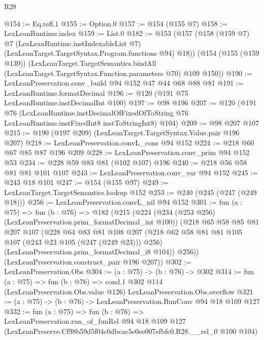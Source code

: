 \begin{lexlean}{R28}
\begin{coremodule}
@154 := Eq.refl.{1}
@155 := Option.{0}
@157 := @154 (@155 @7)
@158 := LexLeanRuntime.index
@159 := List.{0}
@182 := @153
    (@157
      (@158
        (@159 @7)
        @7
        (LexLeanRuntime.instIndexableList @7)
        (LexLeanTarget.TargetSyntax.Program.functions @94)
        @18))
    (@154
      (@155 (@159 @139))
      (LexLeanTarget.TargetSemantics.bindAll
        (LexLeanTarget.TargetSyntax.Function.parameters @70)
        @109
        @150))
@190 := LexLeanPreservation.conv_build @94 @152 @47 @44 @68 @88 @81
@191 := LexLeanRuntime.formatDecimal
@196 := @120 (@191 @75 LexLeanRuntime.instDecimalInt @100)
@197 := @98 @196
@207 := @120
    (@191
      @76
      (LexLeanRuntime.instDecimalOfFixedOfToString
        @76
        LexLeanRuntime.instFixedInt8
        instToStringInt8)
      @104)
@209 := @98 @207 @107
@215 := @190 (@197 @209) (LexLeanTarget.TargetSyntax.Value.pair @196 @207)
@218 := LexLeanPreservation.convL_cons @94 @152
@224 := @218 @60 @67 @85 @87 @196 @209
@228 := LexLeanPreservation.conv_prim @94 @152 @53
@234 := @228 @59 @83 @81 (@102 @107) @196
@240 := @218 @56 @58 @81 @81 @101 @107
@243 := LexLeanPreservation.conv_var @94 @152
@245 := @243 @18 @101
@247 := @154 (@155 @97)
@249 := LexLeanTarget.TargetSemantics.lookup @152
@253 := @240 (@245 (@247 (@249 @18)))
@256 := LexLeanPreservation.convL_nil @94 @152
@301 := fun (a : @75) =>
  fun (b : @76) =>
  @182
    (@215
      (@224
        (@234 (@253 @256) (LexLeanPreservation.prim_formatDecimal_int @100))
        (@218
          @65
          @58
          @85
          @81
          @207
          @107
          (@228
            @64
            @83
            @81
            @108
            @207
            (@218 @62 @58 @81 @81 @105 @107 (@243 @23 @105 (@247 (@249 @23))) @256)
            (LexLeanPreservation.prim_formatDecimal_i8 @104))
          @256))
      (LexLeanPreservation.construct_pair @196 @207))
@302 := LexLeanPreservation.Obs
@304 := (a : @75) -> (b : @76) -> @302
@314 := fun (a : @75) =>
  fun (b : @76) =>
  cond.{1} @302 @114 (LexLeanPreservation.Obs.value @126) LexLeanPreservation.Obs.overflow
@321 := (a : @75) -> (b : @76) -> LexLeanPreservation.RunConv @94 @18 @109 @127
@332 := fun (a : @75) =>
  fun (b : @76) =>
  LexLeanPreservation.run_of_funRel
    @94
    @18
    @109
    @127
    (LexLeanPreserve.Cf98b59d5f04c0dbcac5e0ee007efbfe0.R28.__rel_0 @100 @104)
\end{coremodule}
\end{lexlean}
